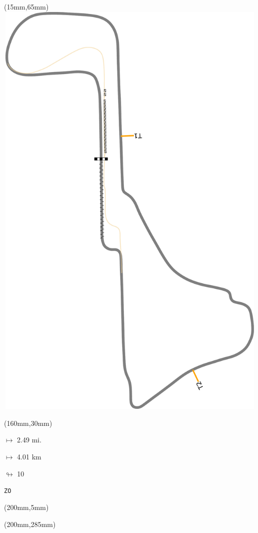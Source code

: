 \begin{textblock*}{185mm}(15mm,65mm)%
\centering
\mbox{\includegraphics[width=185mm,height=210mm,keepaspectratio]{PT/ZO.pdf}}
\end{textblock*}
\begin{textblock*}{40mm}(160mm,30mm)%
\Large
\par$\mapsto$ 2.49 mi.
\par$\mapsto$ 4.01 km
\par$\looparrowright$ 10
\par\hfill\tiny\tt ZO\\
\end{textblock*}
\begin{textblock*}{20mm}(200mm,5mm)%
\fbox{\thepage}
\label{ZO}
\end{textblock*}
\begin{textblock*}{20mm}(200mm,285mm)%
\fbox{\thepage}
\end{textblock*}

